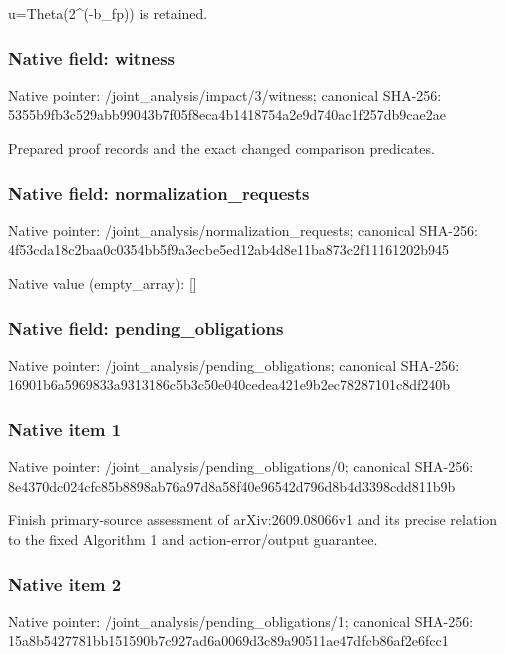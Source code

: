\documentclass[10pt,a4paper]{article}
\begin{document}
u=\allowbreak{}Theta(2\textasciicircum{}(-b\_\allowbreak{}fp)) is retained.\par\endgroup

\subsubsection{Native field: witness}
Native pointer: /joint\_\allowbreak{}analysis/impact/3/witness; canonical SHA-256: 5355b9fb3c529abb99043b7f05f8eca4b1418754a2e9d740ac1f257db9cae2ae

\begingroup\raggedright\sloppy Prepared proof records and the exact changed comparison predicates.\par\endgroup

\subsubsection{Native field: normalization\_\allowbreak{}requests}
Native pointer: /joint\_\allowbreak{}analysis/normalization\_\allowbreak{}requests; canonical SHA-256: 4f53cda18c2baa0c0354bb5f9a3ecbe5ed12ab4d8e11ba873c2f11161202b945

Native value (empty\_\allowbreak{}array): []

\subsubsection{Native field: pending\_\allowbreak{}obligations}
Native pointer: /joint\_\allowbreak{}analysis/pending\_\allowbreak{}obligations; canonical SHA-256: 16901b6a5969833a9313186c5b3c50e040cedea421e9b2ec78287101c8df240b

\subsubsection{Native item 1}
Native pointer: /joint\_\allowbreak{}analysis/pending\_\allowbreak{}obligations/0; canonical SHA-256: 8e4370dc024cfc85b8898ab76a97d8a58f40e96542d796d8b4d3398cdd811b9b

\begingroup\raggedright\sloppy Finish primary-source assessment of arXiv:\allowbreak{}2609.08066v1 and its precise relation to the fixed Algorithm 1 and action-error/\allowbreak{}output guarantee.\par\endgroup

\subsubsection{Native item 2}
Native pointer: /joint\_\allowbreak{}analysis/pending\_\allowbreak{}obligations/1; canonical SHA-256: 15a8b5427781bb151590b7c927ad6a0069d3c89a90511ae47dfcb86af2e6fcc1
\end{document}

